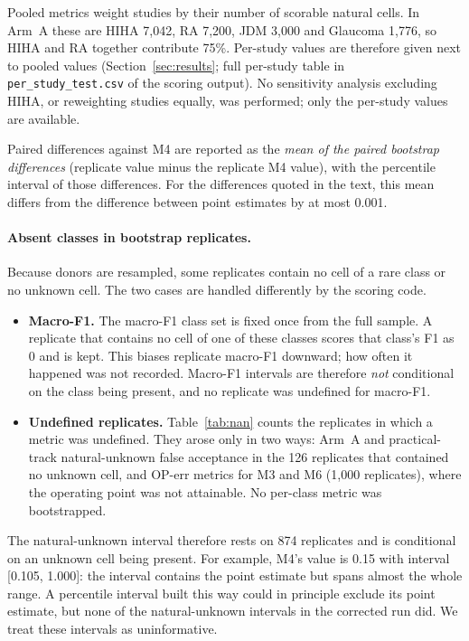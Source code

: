 \documentclass[11pt]{article}
\begin{document}
Pooled metrics weight studies by their number of scorable natural cells. In Arm~A these are HIHA 7{,}042, RA 7{,}200, JDM 3{,}000 and Glaucoma 1{,}776, so HIHA and RA together contribute 75\%. Per-study values are therefore given next to pooled values (Section~\ref{sec:results}; full per-study table in \nolinkurl{per_study_test.csv} of the scoring output). No sensitivity analysis excluding HIHA, or reweighting studies equally, was performed; only the per-study values are available.

Paired differences against M4 are reported as the \emph{mean of the paired bootstrap differences} (replicate value minus the replicate M4 value), with the percentile interval of those differences. For the differences quoted in the text, this mean differs from the difference between point estimates by at most 0.001.

\paragraph{Absent classes in bootstrap replicates.} Because donors are resampled, some replicates contain no cell of a rare class or no unknown cell. The two cases are handled differently by the scoring code.
\begin{itemize}
\item \textbf{Macro-F1.} The macro-F1 class set is fixed once from the full sample. A replicate that contains no cell of one of these classes scores that class's F1 as 0 and is kept. This biases replicate macro-F1 downward; how often it happened was not recorded. Macro-F1 intervals are therefore \emph{not} conditional on the class being present, and no replicate was undefined for macro-F1.
\item \textbf{Undefined replicates.} Table~\ref{tab:nan} counts the replicates in which a metric was undefined. They arose only in two ways: Arm~A and practical-track natural-unknown false acceptance in the 126 replicates that contained no unknown cell, and OP-err metrics for M3 and M6 (1{,}000 replicates), where the operating point was not attainable. No per-class metric was bootstrapped.
\end{itemize}
The natural-unknown interval therefore rests on 874 replicates and is conditional on an unknown cell being present. For example, M4's value is 0.15 with interval [0.105, 1.000]: the interval contains the point estimate but spans almost the whole range. A percentile interval built this way could in principle exclude its point estimate, but none of the natural-unknown intervals in the corrected run did. We treat these intervals as uninformative.
\end{document}
